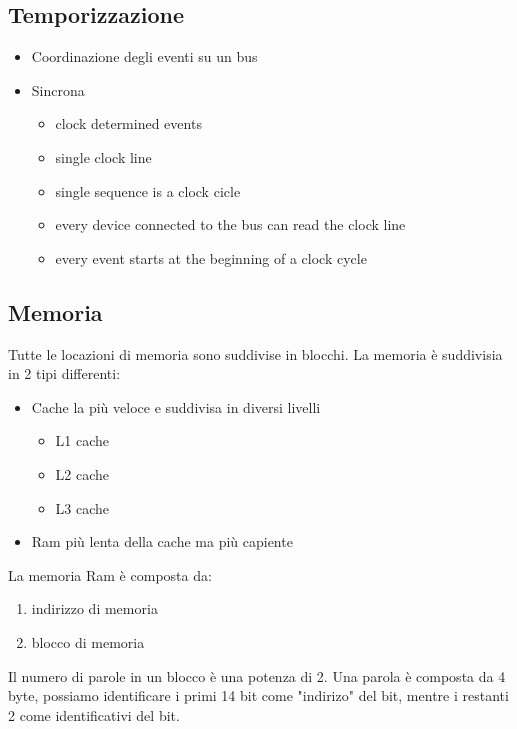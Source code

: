 \documentclass[12pt, a4paper]{article}
\theoremstyle{break}
\theoremstyle{lemma}
\theoremstyle{lemma}
\theoremstyle{lemma}
\begin{document}
\subsection{Temporizzazione}
\begin{itemize}
	\item Coordinazione degli eventi su un bus
	\item Sincrona
	\begin{itemize}
		\item clock determined events
		\item single clock line
		\item single sequence is a clock cicle
		\item every device connected to the bus can read the clock line
		\item every event starts at the beginning of a clock cycle
	\end{itemize}
\end{itemize}

\subsection{Memoria}
Tutte le locazioni di memoria sono suddivise in blocchi. \newline
La memoria è suddivisia in 2 tipi differenti:
\begin{itemize}
	\item Cache la più veloce e suddivisa in diversi livelli
		\begin{itemize}
			\item L1 cache
			\item L2 cache
			\item L3 cache
		\end{itemize}
	\item Ram più lenta della cache ma più capiente
\end{itemize}

La memoria Ram è composta da:
\begin{enumerate}
	\item indirizzo di memoria
	\item blocco di memoria 
\end{enumerate}
Il numero di parole in un blocco è una potenza di 2. \newline
Una parola è composta da 4 byte, possiamo identificare i primi 14 bit come "indirizo" del bit, mentre i restanti 2 come identificativi del bit.
\end{document}
